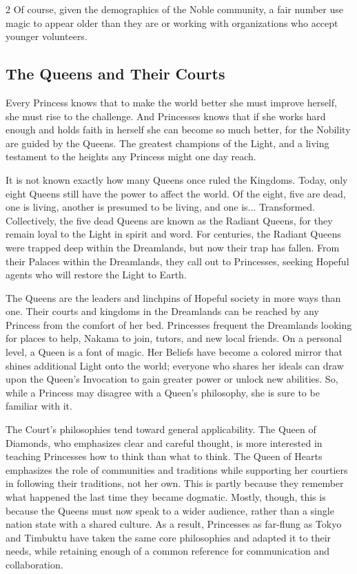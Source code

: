 \begin{multicols}{2}
Of course, given the demographics of the Noble community, a fair number use magic to appear older than they are or working with organizations who accept younger volunteers. 

\subsection*{The Queens and Their Courts}

Every Princess knows that to make the world better she must improve herself, she must rise to the challenge. And Princesses knows that if she works hard enough and holds faith in herself she can become so much better, for the Nobility are guided by the Queens. The greatest champions of the Light, and a living testament to the heights any Princess might one day reach. 

It is not known exactly how many Queens once ruled the Kingdoms. Today, only eight Queens still have the power to affect the world. Of the eight, five are dead, one is living, another is presumed to be living, and one is... Transformed. Collectively, the five dead Queens are known as the Radiant Queens, for they remain loyal to the Light in spirit and word. For centuries, the Radiant Queens were trapped deep within the Dreamlands, but now their trap has fallen. From their Palaces within the Dreamlands, they call out to Princesses, seeking Hopeful agents who will restore the Light to Earth. 

The Queens are the leaders and linchpins of Hopeful society in more ways than one. Their courts and kingdoms in the Dreamlands can be reached by any Princess from the comfort of her bed. Princesses frequent the Dreamlands looking for places to help, Nakama to join, tutors, and new local friends. On a personal level, a Queen is a font of magic. Her Beliefs have become a colored mirror that shines additional Light onto the world; everyone who shares her ideals can draw upon the Queen's Invocation to gain greater power or unlock new abilities. So, while a Princess may disagree with a Queen's philosophy, she is sure to be familiar with it. 

The Court's philosophies tend toward general applicability. The Queen of Diamonds, who emphasizes clear and careful thought, is more interested in teaching Princesses how to think than what to think. The Queen of Hearts emphasizes the role of communities and traditions while supporting her courtiers in following their traditions, not her own. This is partly because they remember what happened the last time they became dogmatic. Mostly, though, this is because the Queens must now speak to a wider audience, rather than a single nation state with a shared culture. As a result, Princesses as far-flung as Tokyo and Timbuktu have taken the same core philosophies and adapted it to their needs, while retaining enough of a common reference for communication and collaboration. 


\end{multicols}
